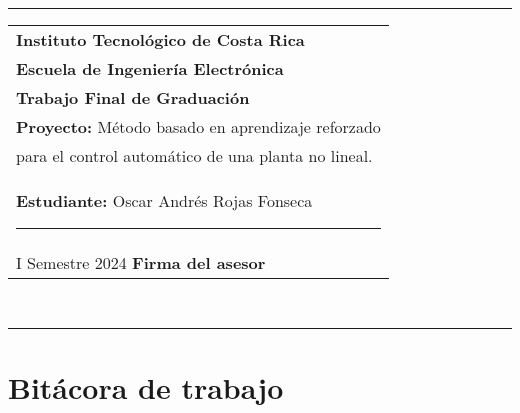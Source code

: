 \documentclass[12pt]{article}
\begin{document}
\hfill\\
\rule{\textwidth}{1.5pt}

\begin{minipage}[t]{85mm}
  \begin{tabular}{l}
    \textbf{\large Instituto Tecnológico de Costa Rica} \\  
    \textbf{Escuela de Ingeniería Electrónica} \\
    \textbf{Trabajo Final de Graduación} \\
    \textbf{Proyecto:} Método basado en aprendizaje reforzado \\para el control automático de una planta no lineal. \\
    \textbf{Estudiante:} Oscar Andrés Rojas Fonseca \hspace{3cm}\rule{4.5cm}{1.5pt}\\
    I Semestre 2024 \hspace{8.5cm}\textbf{Firma del asesor}
  \end{tabular}
\end{minipage}
\hfill\\
\rule{\textwidth}{1.5pt}


\section*{Bitácora de trabajo}
\end{document}
